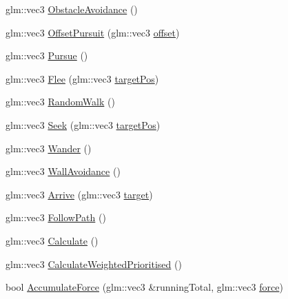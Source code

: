 \begin{DoxyCompactItemize}
\item 
glm\-::vec3 \hyperlink{class_b_g_e_1_1_steering_controller_a5c692e0d558ec141f7dec2d4acfe894a}{Obstacle\-Avoidance} ()
\item 
glm\-::vec3 \hyperlink{class_b_g_e_1_1_steering_controller_a4001a9088cbcb95669987f9c9224e68d}{Offset\-Pursuit} (glm\-::vec3 \hyperlink{class_b_g_e_1_1_steering_controller_ae105c8426aa2bf9856ea0e53d95a366c}{offset})
\item 
glm\-::vec3 \hyperlink{class_b_g_e_1_1_steering_controller_a6c18ec372681941ca2dff0fa4d75b975}{Pursue} ()
\item 
glm\-::vec3 \hyperlink{class_b_g_e_1_1_steering_controller_a00ccbf697f03b6b02e0b028d30e0c6e5}{Flee} (glm\-::vec3 \hyperlink{class_b_g_e_1_1_steering_controller_a0484eb39c0aaf8b38caf6e2aa836fc05}{target\-Pos})
\item 
glm\-::vec3 \hyperlink{class_b_g_e_1_1_steering_controller_a838ed1cc1b6b8d146af97ca0fad8edb9}{Random\-Walk} ()
\item 
glm\-::vec3 \hyperlink{class_b_g_e_1_1_steering_controller_af21ca382fa09f039518c0ed740e84a1b}{Seek} (glm\-::vec3 \hyperlink{class_b_g_e_1_1_steering_controller_a0484eb39c0aaf8b38caf6e2aa836fc05}{target\-Pos})
\item 
glm\-::vec3 \hyperlink{class_b_g_e_1_1_steering_controller_a0cb8b40f2baa4e7c5a2125da562757d1}{Wander} ()
\item 
glm\-::vec3 \hyperlink{class_b_g_e_1_1_steering_controller_a163a9e14005db77dcc744be2cc7fdf47}{Wall\-Avoidance} ()
\item 
glm\-::vec3 \hyperlink{class_b_g_e_1_1_steering_controller_ac58aacfac4e65a8fb7e9876100320663}{Arrive} (glm\-::vec3 \hyperlink{class_b_g_e_1_1_steering_controller_aa692367fc05dd499a1cc55995147a76a}{target})
\item 
glm\-::vec3 \hyperlink{class_b_g_e_1_1_steering_controller_a7c665ab03a5de88c8ed7d506a6353ede}{Follow\-Path} ()
\item 
glm\-::vec3 \hyperlink{class_b_g_e_1_1_steering_controller_a83fd612fb65fe1ef6be18c4dfd09ceed}{Calculate} ()
\item 
glm\-::vec3 \hyperlink{class_b_g_e_1_1_steering_controller_ada60d4814e517f41810dc6e904e8e667}{Calculate\-Weighted\-Prioritised} ()
\item 
bool \hyperlink{class_b_g_e_1_1_steering_controller_a6d749c1ad78a1d7017ee5d4bce336515}{Accumulate\-Force} (glm\-::vec3 \&running\-Total, glm\-::vec3 \hyperlink{class_b_g_e_1_1_steering_controller_ad10b3de08abf1b1d18b72628012fd011}{force})
\end{DoxyCompactItemize}
